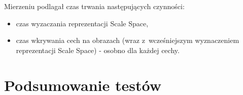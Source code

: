 Mierzeniu podlagał czas trwania następujących czynności:
\begin{itemize}
\item czas wyzaczania reprezentacji Scale Space,
\item czas wkrywania cech na obrazach (wraz z~wcześniejszym wyznaczeniem reprezentacji Scale Space) - osobno dla każdej cechy.
\end{itemize}


\section{Podsumowanie testów}
\label{sec:testPodsumowanie}

